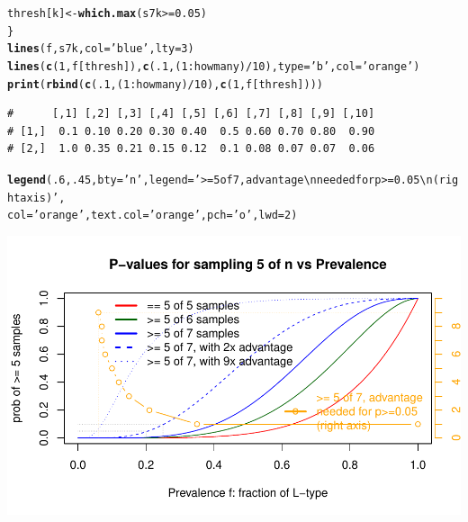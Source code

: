 \documentclass{article}\usepackage[]{graphicx}\usepackage[]{color}
\makeatletter
\def\maxwidth{ %
  \ifdim\Gin@nat@width>\linewidth
    \linewidth
  \else
    \Gin@nat@width
  \fi
}
\newcommand{\hlnum}[1]{\textcolor[rgb]{0.686,0.059,0.569}{#1}}%
\newcommand{\hlstr}[1]{\textcolor[rgb]{0.192,0.494,0.8}{#1}}%
\newcommand{\hlopt}[1]{\textcolor[rgb]{0,0,0}{#1}}%
\newcommand{\hlstd}[1]{\textcolor[rgb]{0.345,0.345,0.345}{#1}}%
\newcommand{\hlkwb}[1]{\textcolor[rgb]{0.69,0.353,0.396}{#1}}%
\newcommand{\hlkwc}[1]{\textcolor[rgb]{0.333,0.667,0.333}{#1}}%
\newcommand{\hlkwd}[1]{\textcolor[rgb]{0.737,0.353,0.396}{\textbf{#1}}}%
\newenvironment{kframe}{%
 \def\at@end@of@kframe{}%
 \ifinner\ifhmode%
  \def\at@end@of@kframe{\end{minipage}}%
  \begin{minipage}{\columnwidth}%
 \fi\fi%
 \def\FrameCommand##1{\hskip\@totalleftmargin \hskip-\fboxsep
 \colorbox{shadecolor}{##1}\hskip-\fboxsep
     \hskip-\linewidth \hskip-\@totalleftmargin \hskip\columnwidth}%
 \MakeFramed {\advance\hsize-\width
   \@totalleftmargin\z@ \linewidth\hsize
   \@setminipage}}%
 {\par\unskip\endMakeFramed%
 \at@end@of@kframe}
\newenvironment{knitrout}{}{} %
\makeatother
\begin{document}
\begin{knitrout}
\begin{kframe}
\begin{alltt}
  \hlstd{thresh[k]} \hlkwb{<-} \hlkwd{which.max}\hlstd{(s7k} \hlopt{>=} \hlnum{0.05}\hlstd{)}
\hlstd{\}}
\hlkwd{lines}\hlstd{(f, s7k,} \hlkwc{col}\hlstd{=}\hlstr{'blue'}\hlstd{,} \hlkwc{lty}\hlstd{=}\hlnum{3}\hlstd{)}
\hlkwd{lines}\hlstd{(}\hlkwd{c}\hlstd{(}\hlnum{1}\hlstd{,f[thresh]),} \hlkwd{c}\hlstd{(}\hlnum{.1}\hlstd{, (}\hlnum{1}\hlopt{:}\hlstd{howmany)}\hlopt{/}\hlnum{10}\hlstd{),} \hlkwc{type}\hlstd{=}\hlstr{'b'}\hlstd{,} \hlkwc{col}\hlstd{=}\hlstr{'orange'}\hlstd{)}
\hlkwd{print}\hlstd{(}\hlkwd{rbind}\hlstd{(}\hlkwd{c}\hlstd{(}\hlnum{.1}\hlstd{, (}\hlnum{1}\hlopt{:}\hlstd{howmany)}\hlopt{/}\hlnum{10}\hlstd{),} \hlkwd{c}\hlstd{(}\hlnum{1}\hlstd{,f[thresh])))}
\end{alltt}
\begin{verbatim}
#      [,1] [,2] [,3] [,4] [,5] [,6] [,7] [,8] [,9] [,10]
# [1,]  0.1 0.10 0.20 0.30 0.40  0.5 0.60 0.70 0.80  0.90
# [2,]  1.0 0.35 0.21 0.15 0.12  0.1 0.08 0.07 0.07  0.06
\end{verbatim}
\begin{alltt}
\hlkwd{legend}\hlstd{(}\hlnum{.6}\hlstd{,} \hlnum{.45}\hlstd{,} \hlkwc{bty}\hlstd{=}\hlstr{'n'}\hlstd{,} \hlkwc{legend}\hlstd{=}\hlstr{'>= 5 of 7, advantage\textbackslash{}nneeded for p>=0.05\textbackslash{}n(right axis)'}\hlstd{,}
       \hlkwc{col}\hlstd{=}\hlstr{'orange'}\hlstd{,} \hlkwc{text.col}\hlstd{=}\hlstr{'orange'}\hlstd{,} \hlkwc{pch}\hlstd{=}\hlstr{'o'}\hlstd{,} \hlkwc{lwd}\hlstd{=}\hlnum{2}\hlstd{)}
\end{alltt}
\end{kframe}

{\centering \includegraphics[width=\maxwidth]{asex-figs-knitr/substantial-minority-1} 

}



\end{knitrout}
\end{document}

